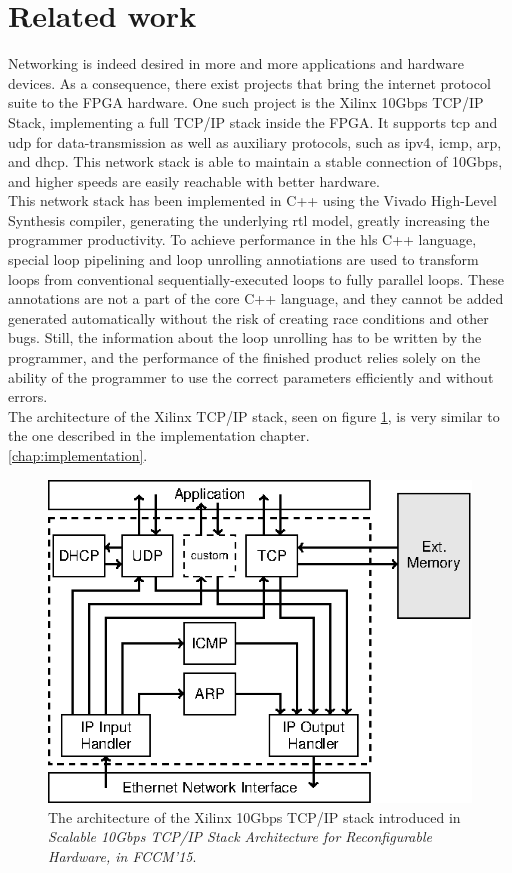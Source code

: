 \section{Related work}
Networking is indeed desired in more and more applications and hardware devices.
As a consequence, there exist projects that bring the internet protocol suite to
the FPGA hardware. One such project is the Xilinx 10Gbps TCP/IP Stack,
implementing a full TCP/IP stack inside the FPGA. It supports \gls{tcp} and
\gls{udp} for data-transmission as well as auxiliary protocols, such as
\gls{ipv4}, \gls{icmp}, \gls{arp}, and \gls{dhcp}.
This network stack is able to maintain a stable connection of 10Gbps, and higher
speeds are easily reachable with better hardware\cite{sidler2015tcp}.\\
This network stack has been implemented in C++ using the Vivado High-Level
Synthesis compiler, generating the underlying \gls{rtl} model, greatly increasing
the programmer productivity.
To achieve performance in the \gls{hls} C++ language, special loop pipelining and
loop unrolling annotiations are used to transform loops from conventional
sequentially-executed loops to fully parallel loops\cite{xilinx_loop_unrolling}.
These annotations are not a part of the core C++ language, and they cannot be
added generated automatically without the risk of creating race conditions and
other bugs. Still, the information about the loop unrolling has to be
written by the programmer, and the performance of the finished product
relies solely on the ability of the programmer to use the correct parameters
efficiently and without errors.\\
The architecture of the Xilinx
TCP/IP stack, seen on figure \ref{fig:fccm2015}, is very similar to the
one described in the implementation chapter.\\

\ref{chap:implementation}.
\begin{figure}[h]
\centering
\includegraphics[scale=1]{introduction/fccm2015.eps}
\caption{The architecture of the Xilinx 10Gbps TCP/IP stack introduced in
\textit{Scalable 10Gbps TCP/IP Stack Architecture for Reconfigurable Hardware,
in FCCM’15}\cite{sidler2015tcp}.}
\label{fig:fccm2015}
\end{figure}

